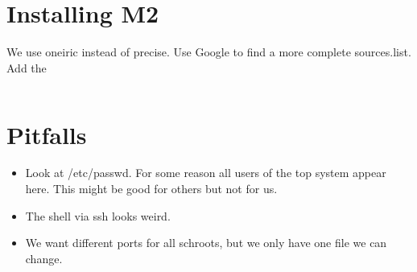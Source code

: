 \documentclass[a4paper]{article}
\begin{document}
\section{Installing M2}

We use oneiric instead of precise.
Use Google to find a more complete sources.list.
Add the

\begin{verbatim}

\end{verbatim}


\section{Pitfalls}
\begin{itemize}
\item Look at /etc/passwd. For some reason all users of the top system appear here. This might be good for others but not for us.
\item The shell via ssh looks weird.
\item We want different ports for all schroots, but we only have one file we can change.
\end{itemize}
\end{document}
